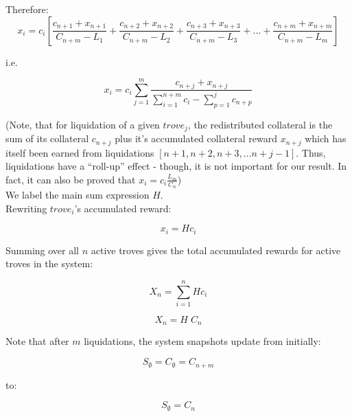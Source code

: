 \documentclass[reqno]{article}
\begin{document}
Therefore:\\

\begin{equation} 
    x_i=c_i\left[\frac{c_{n+1}+x_{n+1}}{C_{n+m}-L_1}+\frac{c_{n+2}+x_{n+2}}{C_{n+m}-L_2}+\frac{c_{n+3}+x_{n+3}}{C_{n+m}-L_3}+...+\frac{c_{n+m}+x_{n+m}}{C_{n+m}-L_m}\right]
\end{equation}

\bigskip
i.e.

\begin{equation} 
    x_i=c_i\sum\limits^m_{j=1}\frac{c_{n+j}+x_{n+j}}{\sum\limits^{n+m}_{i=1}c_i-\sum\limits^j_{p=1}c_{n+p}}
\end{equation}

\bigskip
(Note, that for liquidation of a given $trove_j$, the redistributed collateral is the sum of its collateral $c_{n+j}$ plus it’s accumulated collateral reward $x_{n+j}$ which has itself been earned from liquidations $[n+1, n+2, n+3, … n+j-1]$.  Thus, liquidations have a “roll-up” effect - though, it is not important for our result. In fact, it can also be proved that $x_i=c_i\frac{L_m}{C_n}$)\\

We label the main sum expression $H$.\\

Rewriting $trove_i$’s accumulated reward:

\begin{equation} \label{eq:45}
    x_i=Hc_i
\end{equation}

\bigskip
Summing over all $n$ active troves gives the total accumulated rewards for active troves in the system:

\begin{equation} 
    X_n=\sum\limits^n_{i=1}Hc_i
\end{equation}

\begin{equation} \label{eq:47}
    X_n=H \; C_n
\end{equation}

\bigskip
Note that after $m$ liquidations, the system snapshots update from initially:

\begin{equation}
    S_\emptyset = C_\emptyset = C_{n+m}
\end{equation}

to:

\begin{equation} \label{eq:8}
    S_\emptyset=C_n
\end{equation}
\end{document}
